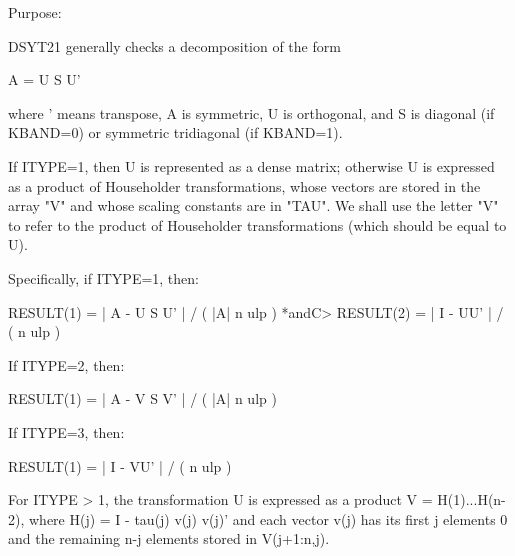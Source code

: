 \begin{DoxyParagraph}{Purpose\+: }
\begin{DoxyVerb} DSYT21 generally checks a decomposition of the form

    A = U S U'

 where ' means transpose, A is symmetric, U is orthogonal, and S is
 diagonal (if KBAND=0) or symmetric tridiagonal (if KBAND=1).

 If ITYPE=1, then U is represented as a dense matrix; otherwise U is
 expressed as a product of Householder transformations, whose vectors
 are stored in the array "V" and whose scaling constants are in "TAU".
 We shall use the letter "V" to refer to the product of Householder
 transformations (which should be equal to U).

 Specifically, if ITYPE=1, then:

    RESULT(1) = | A - U S U' | / ( |A| n ulp ) *andC>    RESULT(2) = | I - UU' | / ( n ulp )

 If ITYPE=2, then:

    RESULT(1) = | A - V S V' | / ( |A| n ulp )

 If ITYPE=3, then:

    RESULT(1) = | I - VU' | / ( n ulp )

 For ITYPE > 1, the transformation U is expressed as a product
 V = H(1)...H(n-2),  where H(j) = I  -  tau(j) v(j) v(j)' and each
 vector v(j) has its first j elements 0 and the remaining n-j elements
 stored in V(j+1:n,j).\end{DoxyVerb}
 
\end{DoxyParagraph}

